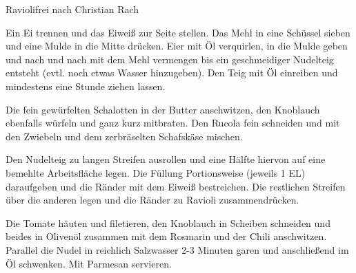 \begin{recipe}{Ravioli}{frei nach Christian Rach}
  \label{Ravoli}



  \steps
  Ein Ei trennen und das Eiweiß zur Seite stellen. Das Mehl in eine Schüssel sieben und
  eine Mulde in die Mitte drücken. Eier mit Öl verquirlen, in die Mulde geben und nach und
  nach mit dem Mehl vermengen bis ein geschmeidiger Nudelteig entsteht (evtl. noch etwas
  Wasser hinzugeben). Den Teig mit Öl einreiben und mindestens eine Stunde ziehen lassen.

  Die fein gewürfelten Schalotten in der Butter anschwitzen, den Knoblauch ebenfalls
  würfeln und ganz kurz mitbraten. Den Rucola fein schneiden und mit den Zwiebeln und dem
  zerbräselten Schafskäse mischen.

  Den Nudelteig zu langen Streifen ausrollen und eine Hälfte hiervon auf eine bemehlte
  Arbeitsfläche legen. Die Füllung Portionsweise (jeweils 1 EL) daraufgeben und die Ränder
  mit dem Eiweiß bestreichen. Die restlichen Streifen  über die anderen legen und die
  Ränder zu Ravioli zusammendrücken.

  Die Tomate häuten und filetieren, den Knoblauch in Scheiben schneiden und beides in
  Olivenöl zusammen mit dem Rosmarin  und der Chili anschwitzen. Parallel die Nudel in
  reichlich Salzwasser 2-3 Minuten garen und anschließend im Öl schwenken. Mit Parmesan
  servieren.
\end{recipe}
